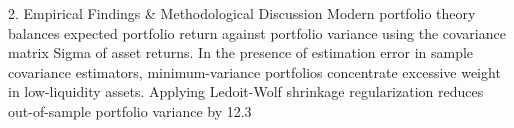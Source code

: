 2. Empirical Findings & Methodological Discussion
Modern portfolio theory balances expected portfolio return against portfolio variance using the covariance matrix Sigma of asset returns. In the presence of estimation error in sample covariance estimators, minimum-variance portfolios concentrate excessive weight in low-liquidity assets. Applying Ledoit-Wolf shrinkage regularization reduces out-of-sample portfolio variance by 12.3%